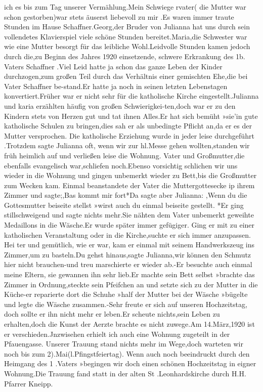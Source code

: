 \documentclass[a4paper,11pt]{article}
\begin{document}
 ich es bis zum Tag unserer Vermählung.Mein Schwiege rvater( die Mutter war schon gestorben)war stets äuserst liebevoll zu mir .Es waren immer traute Stunden im Hause Schaffner.Georg,der Bruder von Julianna hat uns durch sein vollendetes Klavierspiel viele schöne Stunden bereitet.Maria,die Schwester war wie eine Mutter besorgt für das leibliche Wohl.Leidvolle Stunden kamen jedoch durch die,zu Beginn des Jahres 1920 einsetzende, schwere Erkrankung des 1b. Vaters Schaffner .Viel Leid hatte ja schon das ganze Leben der Kinder durchzogen,zum großen Teil durch das Verhältnis einer gemischten Ehe,die bei Vater Schaffner be-stand.Er hatte ja noch in seinen letzten Lebenstagen konvertiert.Früher war er nicht sehr für die katholische Kirche eingestellt.Julianna und karia erzählten häufig von großen Schwierigkei-ten,doch war er zu den Kindern stets von Herzen gut und tat ihnen Alles.Er hat sich bemüht »sie’in gute katholische Schulen zu bringen,dies sah er als unbedingte Pflicht an,da er es der Mutter versprochen. Die katholische Erziehung wurde in jeder leise durchgeführt .Trotzdem sagte Julianna oft, wenn wir zur hl.Messe gehen wollten,standen wir früh heimlich auf und verließen leise die Wohnung. Vater und Großmutter,die ebenfalls evangelisch war,schliefen noch.Ebenso vorsichtig schlichen wir uns wieder in die Wohnung und gingen unbemerkt wieder zu Bett,bis die Großmutter zum Wecken kam. Einmal beanstandete der Vater die Muttergottesecke ip ihrem Zimmer und sagte;,Bas kommt mir fort*Da sagte aber Julianna: ,Wenn du die Gottesmutter beiseite stellst »wirst auch du einmal beiseite gestellt. *Er ging stillschweigend und sagte nichts mehr.Sie nähten dem Vater unbemerkt geweihte Medaillons in die Wäsche.Er wurde später immer gefügiger. Ging er mit zu einer katholischen Veranstaltung oder in die Kirche,suchte er sich immer anzupassen. Hei ter und gemütlich, wie er war, kam er einmal mit seinem Handwerkszeug ins Zimmer,um zu basteln.Du gehst hinaus,sagte Julianna,wir können den Schmutz hier nicht brauchen-und treu marschierte er wieder ab.-Er besuchte auch einmal meine Eltern, sie gewannen ihn sehr lieb.Er machte sein Bett selbst »brachte das Zimmer in Ordnung,steckte sein Pfeifchen an und setzte sich zu der Mutter in die Küche-er reparierte dort die Schuhe »half der Mutter bei der Wäsche »bügelte und legte die Wäsche zusammen.-Sehr freute er sich auf unseren Hochzeitstag, doch sollte er ihn nicht mehr er leben.Er scheute nichts,sein Leben zu erhalten,doch die Kunst der Aerzte brachte es nicht zuwege.Am 14.März,1920 ist er verschieden.Jnzwisehen erhielt ich auch eine Wohnung zugeteilt in der Pfauengasse. Unserer Trauung stand nichts mehr im Wege,doch warteten wir noch bis zum 2).Mai(l.Pfingstfeiertag). Wenn auch noch beeindruckt durch den Heimgang des 1 .Vaters »begingen wir doch einen schönen Hochzeitstag in eigner Wohnung.Die Trauung fand statt in der alten St .Leonhardskirche durch H.H. Pfarrer Kneipp.
\end{document}
